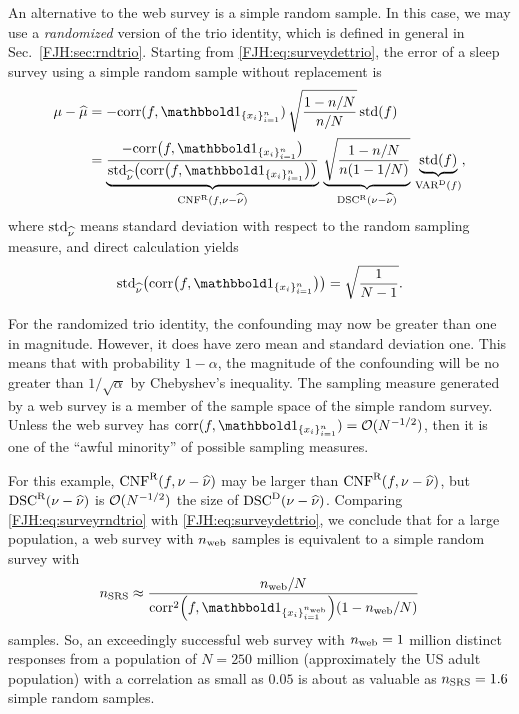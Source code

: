 \documentclass[graybox,footinfo]{svmult}
\DeclareMathOperator{\algn}{CNF}
\DeclareMathOperator{\disc}{DSC}
\DeclareMathOperator{\Var}{VAR}
\begin{document}
An alternative to the web survey is a simple random sample.  In this 
case, we may use a 
\emph{randomized} version of the trio identity, which is defined in general in Sec.\  
\ref{FJH:sec:rndtrio}.  Starting 
from \eqref{FJH:eq:surveydettrio}, the 
error of a sleep survey using a simple random sample without replacement is
\begin{align}
\nonumber
\mu - \widehat{\mu} 
& = -\corr(f, \bbone_{\{x_i\}_{i=1}^n}) \,
\sqrt{\frac{1 - n/N}{n/N}} \, 
\std(f) \\
& = \underbrace{\frac{- \corr\bigl(f, \bbone_{\{x_i\}_{i=1}^n}\bigr)}
{\std_{\hnu} \bigl( \corr\bigl(f, \bbone_{\{x_i\}_{i=1}^n}\bigr)\bigr)}}_{\algn^\Rn(f,\nu - \hnu)} 
\, 
\underbrace{\sqrt{\frac{1-n/N}{n(1-1/N)}}}_{\disc^\Rn(\nu - \hnu)} \, 
\underbrace{\std(f)}_{\Var^\Dt(f)},
\label{FJH:eq:surveyrndtrio}
\end{align}
where $\textup{std}_{\widehat{\nu}}$ means standard deviation with respect to the random sampling 
measure, and direct calculation yields
\begin{equation*}
\std_{\hnu} \bigl( \corr\bigl(f, \bbone_{\{x_i\}_{i=1}^n}\bigr)\bigr) = \sqrt{\frac{1}{N-1}}.
\end{equation*}

For the randomized trio identity, the confounding may now be greater than one in 
magnitude.  However, it  does have zero mean and 
standard deviation one.  This means that with probability $1-\alpha$, the magnitude of 
the confounding will be no greater than $1/\sqrt{\alpha}$ by Chebyshev's inequality. The 
sampling measure generated by a web survey is a member of the sample space of the 
simple random survey.  Unless the 
web survey has $\corr(f, \bbone_{\{x_i\}_{i=1}^n}) = \Order(N^{-1/2})$, then it is one of 
the ``awful minority'' of possible sampling measures.

For this example, $\algn^\Rn(f,\nu - \hnu)$ may be larger than $\algn^\Rn(f,\nu - \hnu)$, 
but  $\disc^\Rn(\nu - \hnu)$ is $\mathcal{O}(N^{-1/2})$ the size of $\disc^\Dt(\nu - 
\hnu)$.  Comparing \eqref{FJH:eq:surveyrndtrio} with 
\eqref{FJH:eq:surveydettrio}, we conclude that for a large population, a web survey with 
$n_{\textup{web}}$ samples is equivalent to a simple random survey with 
\[
n_{\textup{SRS}} \approx \frac{n_{\textup{web}}/N}{\corr^2\Bigl(f, 
\bbone_{\{x_i\}_{i=1}^{n_{\textup{web}}}}\Bigr)(1-n_{\textup{web}}/N)}
\]
samples.  So, an exceedingly successful web survey with $n_{\textup{web}} = 
1$ million distinct responses from a population of $N = 250$ million 
(approximately the US adult population) with a correlation as small as $0.05$ is about as 
valuable as $n_{\textup{SRS}} = 1.6$ simple random samples.
\end{document}

